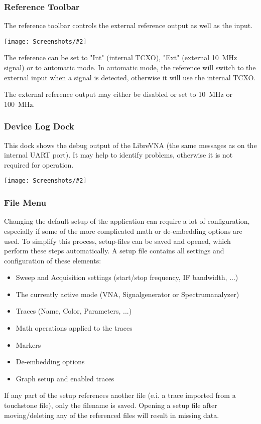 \documentclass[a4paper,11pt]{article}
\newcommand\danger[1][5ex]{%
  \renewcommand\stacktype{L}%
  \scaleto{\stackon[1.3pt]{\color{red}$\triangle$}{\tiny !}}{#1}%
}
\newenvironment{important}[1][]{%
   \begin{mdframed}[%
      backgroundcolor={red!15}, hidealllines=true,
      skipabove=0.7\baselineskip, skipbelow=0.7\baselineskip,
      splitbottomskip=2pt, splittopskip=4pt, #1]%
   \makebox[0pt]{%
      \smash{%
         \hspace*{-45pt}%
         \raisebox{-5pt}{%
            {\danger}%
         }%
      }%
   }%
}{\end{mdframed}}
\newcommand{\vna}{LibreVNA}
\newcommand{\screenshot}[2]{\begin{center}
\texttt{[image: Screenshots/\#2]}
\end{center}}
\begin{document}
\subsubsection{Reference Toolbar}
The reference toolbar controls the external reference output as well as the input.
\screenshot{0.5}{ToolbarReference.png}
The reference can be set to "Int" (internal TCXO), "Ext" (external \SI{10}{\mega\hertz} signal) or to automatic mode. In automatic mode, the reference will switch to the external input when a signal is detected, otherwise it will use the internal TCXO.

The external reference output may either be disabled or set to \SI{10}{\mega\hertz} or \SI{100}{\mega\hertz}.

\subsubsection{Device Log Dock}
This dock shows the debug output of the \vna{} (the same messages as on the internal UART port). It may help to identify problems, otherwise it is not required for operation.
\screenshot{1.0}{DockDeviceLog.png}

\subsubsection{File Menu}
Changing the default setup of the application can require a lot of configuration, especially if some of the more complicated math or de-embedding options are used. To simplify this process, setup-files can be saved and opened, which perform these steps automatically. A setup file contains all settings and configuration of these elements:
\begin{itemize}
\item Sweep and Acquisition settings (start/stop frequency, IF bandwidth, ...)
\item The currently active mode (VNA, Signalgenerator or Spectrumanalyzer)
\item Traces (Name, Color, Parameters, ...)
\item Math operations applied to the traces
\item Markers
\item De-embedding options
\item Graph setup and enabled traces
\end{itemize}
\begin{important}
If any part of the setup references another file (e.i. a trace imported from a touchstone file), only the filename is saved. Opening a setup file after moving/deleting any of the referenced files will result in missing data. 
\end{important}
\end{document}
